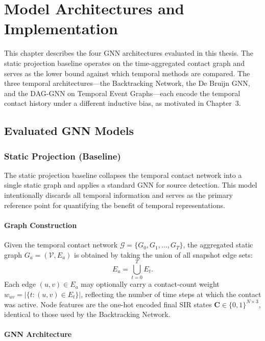 \chapter{Model Architectures and Implementation}
\label{c:chapter5}

This chapter describes the four GNN architectures evaluated in this thesis. The static projection baseline operates on the time-aggregated contact graph and serves as the lower bound against which temporal methods are compared. The three temporal architectures---the Backtracking Network, the De Bruijn GNN, and the DAG-GNN on Temporal Event Graphs---each encode the temporal contact history under a different inductive bias, as motivated in Chapter~3.

\section{Evaluated GNN Models}
\label{st:gnnmodels}

\subsection{Static Projection (Baseline)}
\label{ssst:baselinemodel}

The static projection baseline collapses the temporal contact network into a single static graph and applies a standard GNN for source detection. This model intentionally discards all temporal information and serves as the primary reference point for quantifying the benefit of temporal representations.

\subsubsection{Graph Construction}

Given the temporal contact network $\mathcal{G} = \{G_0, G_1, \ldots, G_T\}$, the aggregated static graph $G_a = (\mathcal{V}, E_a)$ is obtained by taking the union of all snapshot edge sets:
\[
    E_a = \bigcup_{t=0}^{T} E_t.
\]
Each edge $(u, v) \in E_a$ may optionally carry a contact-count weight $w_{uv} = |\{t : (u,v) \in E_t\}|$, reflecting the number of time steps at which the contact was active. Node features are the one-hot encoded final SIR states $\mathbf{C} \in \{0,1\}^{N \times 3}$, identical to those used by the Backtracking Network.

\subsubsection{GNN Architecture}


